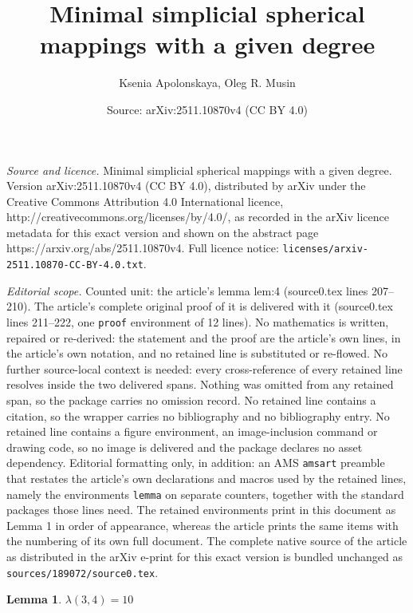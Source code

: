 \documentclass[10pt,a4paper]{amsart}
\title{Minimal simplicial spherical mappings with a given degree}
\author{Ksenia Apolonskaya, Oleg R. Musin}
\date{Source: arXiv:2511.10870v4 (CC BY 4.0)}
\newtheorem{lemma}{Lemma}
\begin{document}
\maketitle

\noindent\emph{Source and licence.} Minimal simplicial spherical mappings with a given degree. Version arXiv:2511.10870v4 (CC BY 4.0), distributed by arXiv under the Creative Commons Attribution 4.0 International licence, http://creativecommons.org/licenses/by/4.0/, as recorded in the arXiv licence metadata for this exact version and shown on the abstract page https://arxiv.org/abs/2511.10870v4. Full licence notice: \texttt{licenses/arxiv-2511.10870-CC-BY-4.0.txt}.\par\smallskip

\noindent\textit{Editorial scope.} Counted unit: the article's lemma lem:4 (source0.tex lines 207--210). The article's complete original proof of it is delivered with it (source0.tex lines 211--222, one \texttt{proof} environment of 12 lines). No mathematics is written, repaired or re-derived: the statement and the proof are the article's own lines, in the article's own notation, and no retained line is substituted or re-flowed.  No further source-local context is needed: every cross-reference of every retained line resolves inside the two delivered spans.  Nothing was omitted from any retained span, so the package carries no omission record.  No retained line contains a citation, so the wrapper carries no bibliography and no bibliography entry.  No retained line contains a figure environment, an image-inclusion command or drawing code, so no image is delivered and the package declares no asset dependency.  Editorial formatting only, in addition: an AMS \texttt{amsart} preamble that restates the article's own declarations and macros used by the retained lines, namely the environments \texttt{lemma} on separate counters, together with the standard packages those lines need.  The retained environments print in this document as Lemma 1 in order of appearance, whereas the article prints the same items with the numbering of its own full document.  The complete native source of the article as distributed in the arXiv e-print for this exact version is bundled unchanged as \texttt{sources/189072/source0.tex}.
\begin{lemma}
\label{lem:4}
$\lambda(3,4)=10$
\end{lemma}
\end{document}
